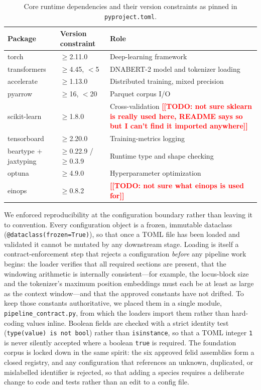 \documentclass[twocolumn,10pt]{article}
\newcommand{\TD}[1]{{\textbf{\textcolor{red}{[[TODO: #1]]}}}}
\begin{document}
\begin{table}[t]
\centering
\caption{Core runtime dependencies and their version constraints as pinned in
\texttt{pyproject.toml}.}
\label{tab:dependencies}
\begin{tabular}{@{}l l p{}@{}}
\toprule
Package & Version constraint & Role \\
\midrule
torch & \(\geq\)2.11.0 & Deep-learning framework \\
transformers & \(\geq\)4.45, \(<\)5 & DNABERT-2 model and tokenizer loading \\
accelerate & \(\geq\)1.13.0 & Distributed training, mixed precision \\
pyarrow & \(\geq\)16, \(<\)20 & Parquet corpus I/O \\
scikit-learn
  & \(\geq\)1.8.0
  & Cross-validation \TD{not sure sklearn is really used here, README says so but I can't find it
  imported anywhere} \\
tensorboard & \(\geq\)2.20.0 & Training-metrics logging \\
beartype + jaxtyping & \(\geq\)0.22.9 / \(\geq\)0.3.9 & Runtime type and shape checking \\
optuna & \(\geq\)4.9.0 & Hyperparameter optimization \\
einops & \(\geq\)0.8.2 & \TD{not sure what einops is used for} \\
\bottomrule
\end{tabular}
\end{table}

We enforced reproducibility at the configuration boundary rather than leaving it to convention.
Every configuration object is a frozen, immutable dataclass (\texttt{@dataclass(frozen=True)}), so
that once a TOML file has been loaded and validated it cannot be mutated by any downstream stage.
Loading is itself a contract-enforcement step that rejects a configuration \emph{before} any
pipeline work begins: the loader verifies that all required sections are present, that the windowing
arithmetic is internally consistent---for example, the locus-block size and the tokenizer's maximum
position embeddings must each be at least as large as the context window---and that the approved
constants have not drifted. To keep those constants authoritative, we placed them in a single
module, \texttt{pipeline\_contract.py}, from which the loaders import them rather than hard-coding
values inline. Boolean fields are checked with a strict identity test (\texttt{type(value) is not
bool}) rather than \texttt{isinstance}, so that a TOML integer \texttt{1} is never silently accepted
where a boolean \texttt{true} is required. The foundation corpus is locked down in the same spirit:
the six approved felid assemblies form a closed registry, and any configuration that references an
unknown, duplicated, or mislabelled identifier is rejected, so that adding a species requires a
deliberate change to code and tests rather than an edit to a config file.
\end{document}
